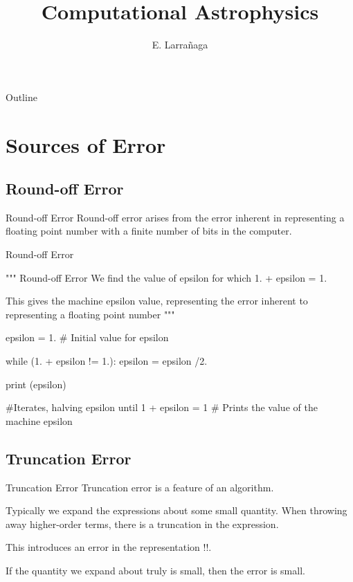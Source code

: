 \documentclass[11pt]{beamer}
\begin{document}
\begin{frame}
\title{Computational Astrophysics}
\author{E. Larrañaga}
\titlepage
\end{frame}

\begin{frame}{Outline}
\tableofcontents
\end{frame}

\section{Sources of Error}

\subsection{Round-off Error}
\begin{frame}[fragile]{Round-off Error}
Round-off error arises from the error inherent in representing a floating point number with a finite number of bits in the computer.
\end{frame}


\begin{frame}[fragile]{Round-off Error}
\tiny
\begin{semiverbatim}
""" 
Round-off Error
We find the value of epsilon for which 1. + epsilon = 1.

This gives the machine epsilon value, representing the error inherent to
representing a floating point number
"""

epsilon = 1. # Initial value for epsilon

while (1. + epsilon != 1.):
    epsilon = epsilon /2.

print (epsilon)
 
#Iterates, halving epsilon until 1 + epsilon = 1
# Prints the value of the machine epsilon
\end{semiverbatim}
\normalsize
\end{frame}

\subsection{Truncation Error}
\begin{frame}[fragile]{Truncation Error}
\normalsize
Truncation error is a feature of an algorithm. \\
\bigskip

Typically we expand the expressions about some small quantity. When throwing away higher-order terms, there is a truncation in the expression.\\
\bigskip

This introduces an error in the representation !!.\\
\bigskip

 If the quantity we expand about truly is small, then the error is small.
\end{frame}
\end{document}
